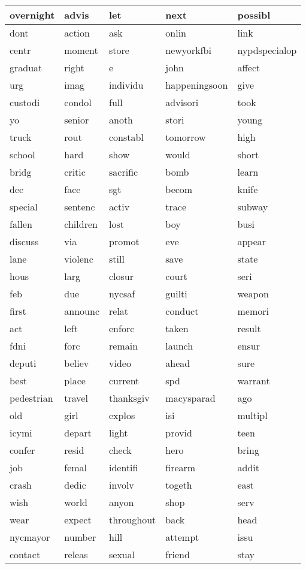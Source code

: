 \begin{longtable}{p{2.5cm}p{2.5cm}p{2.5cm}p{2.5cm}p{2.5cm}}
overnight&advis&let&next&possibl\\ \hline 
dont&action&ask&onlin&link\\ \hline 
centr&moment&store&newyorkfbi&nypdspecialop\\ \hline 
graduat&right&e&john&affect\\ \hline 
urg&imag&individu&happeningsoon&give\\ \hline 
custodi&condol&full&advisori&took\\ \hline 
yo&senior&anoth&stori&young\\ \hline 
truck&rout&constabl&tomorrow&high\\ \hline 
school&hard&show&would&short\\ \hline 
bridg&critic&sacrific&bomb&learn\\ \hline 
dec&face&sgt&becom&knife\\ \hline 
special&sentenc&activ&trace&subway\\ \hline 
fallen&children&lost&boy&busi\\ \hline 
discuss&via&promot&eve&appear\\ \hline 
lane&violenc&still&save&state\\ \hline 
hous&larg&closur&court&seri\\ \hline 
feb&due&nycsaf&guilti&weapon\\ \hline 
first&announc&relat&conduct&memori\\ \hline 
act&left&enforc&taken&result\\ \hline 
fdni&forc&remain&launch&ensur\\ \hline 
deputi&believ&video&ahead&sure\\ \hline 
best&place&current&spd&warrant\\ \hline 
pedestrian&travel&thanksgiv&macysparad&ago\\ \hline 
old&girl&explos&isi&multipl\\ \hline 
icymi&depart&light&provid&teen\\ \hline 
confer&resid&check&hero&bring\\ \hline 
job&femal&identifi&firearm&addit\\ \hline 
crash&dedic&involv&togeth&east\\ \hline 
wish&world&anyon&shop&serv\\ \hline 
wear&expect&throughout&back&head\\ \hline 
nycmayor&number&hill&attempt&issu\\ \hline 
contact&releas&sexual&friend&stay\\ \hline 

\end{longtable}
